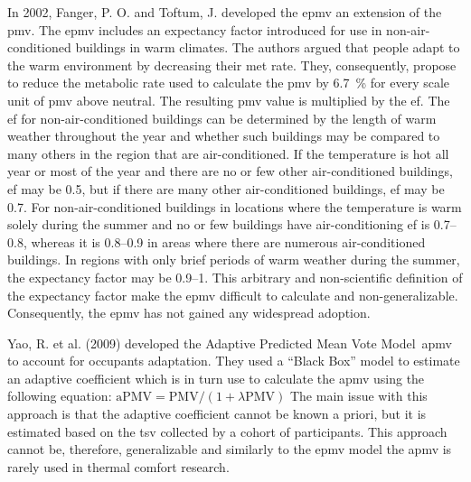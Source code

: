 In 2002, Fanger, P. O. and Toftum, J. developed the \gls{epmv} an extension of the \ac{pmv}.
The \gls{epmv} includes an expectancy factor introduced for use in non-air-conditioned buildings in warm climates.
The authors argued that people adapt to the warm environment by decreasing their \ac{met} rate.
They, consequently, propose to reduce the metabolic rate used to calculate the \ac{pmv} by \qty{6.7}{\percent} for every scale unit of \ac{pmv} above neutral.
The resulting \ac{pmv} value is multiplied by the \ac{ef}.
The \ac{ef} for non-air-conditioned buildings can be determined by the length of warm weather throughout the year and whether such buildings may be compared to many others in the region that are air-conditioned.
If the temperature is hot all year or most of the year and there are no or few other air-conditioned buildings, \ac{ef} may be \num{0.5}, but if there are many other air-conditioned buildings, \ac{ef} may be \num{0.7}.
For non-air-conditioned buildings in locations where the temperature is warm solely during the summer and no or few buildings have air-conditioning \ac{ef} is \numrange{0.7}{0.8}, whereas it is \numrange{0.8}{.9} in areas where there are numerous air-conditioned buildings.
In regions with only brief periods of warm weather during the summer, the expectancy factor may be \numrange{0.9}{1}.
This arbitrary and non-scientific definition of the expectancy factor make the \gls{epmv} difficult to calculate and non-generalizable.
Consequently, the \gls{epmv} has not gained any widespread adoption.

Yao, R. et al. (2009) developed the Adaptive Predicted Mean Vote Model~\gls{apmv} to account for occupants adaptation.
They used a ``Black Box'' model to estimate an adaptive coefficient which is in turn use to calculate the \gls{apmv} using the following equation: $\mathrm{aPMV} = \mathrm{PMV}/(1+\lambda \mathrm{PMV})$
The main issue with this approach is that the adaptive coefficient cannot be known a priori, but it is estimated based on the \ac{tsv} collected by a cohort of participants.
This approach cannot be, therefore, generalizable and similarly to the \gls{epmv} model the \gls{apmv} is rarely used in thermal comfort research.


